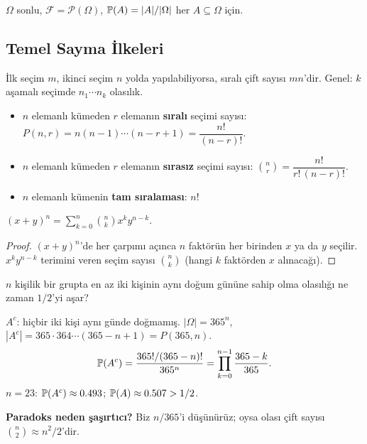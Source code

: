 \begin{tanim}\label{def:klasik}
$\Omega$ sonlu, $\mathcal{F} = \mathcal{P}(\Omega)$,
$\mathbb{P}(A) = |A|/|\Omega|$ her $A \subseteq \Omega$ için.
\end{tanim}

\subsection{Temel Sayma İlkeleri}

\begin{teorem}\label{thm:carpim_ilkesi}
İlk seçim $m$, ikinci seçim $n$ yolda yapılabiliyorsa, sıralı çift sayısı $mn$'dir.
Genel: $k$ aşamalı seçimde $n_1 \cdots n_k$ olasılık.
\end{teorem}

\begin{tanim}\label{def:perm_komb}
\begin{itemize}
  \item $n$ elemanlı kümeden $r$ elemanın \textbf{sıralı} seçimi sayısı:
        $P(n,r) = n(n-1)\cdots(n-r+1) = \dfrac{n!}{(n-r)!}$.
  \item $n$ elemanlı kümeden $r$ elemanın \textbf{sırasız} seçimi sayısı:
        $\binom{n}{r} = \dfrac{n!}{r!\,(n-r)!}$.
  \item $n$ elemanlı kümenin \textbf{tam sıralaması}: $n!$
\end{itemize}
\end{tanim}

\begin{teorem}\label{thm:binom}
$(x+y)^n = \sum_{k=0}^n \binom{n}{k} x^k y^{n-k}$.
\end{teorem}

\begin{proof}
$(x+y)^n$'de her çarpımı açınca $n$ faktörün her birinden $x$ ya da $y$ seçilir.
$x^k y^{n-k}$ terimini veren seçim sayısı $\binom{n}{k}$ (hangi $k$ faktörden $x$ alınacağı).
\end{proof}

\begin{ornek}\label{ex:dogumgunu}
$n$ kişilik bir grupta en az iki kişinin aynı doğum gününe sahip olma
olasılığı ne zaman $1/2$'yi aşar?

$A^c$: hiçbir iki kişi aynı günde doğmamış. $|\Omega| = 365^n$,
$|A^c| = 365 \cdot 364 \cdots (365-n+1) = P(365,n)$.
\[
  \mathbb{P}(A^c) = \frac{365!/(365-n)!}{365^n} = \prod_{k=0}^{n-1}\frac{365-k}{365}.
\]
$n=23$: $\mathbb{P}(A^c) \approx 0.493$; $\mathbb{P}(A) \approx 0.507 > 1/2$.

\textbf{Paradoks neden şaşırtıcı?} Biz $n/365$'i düşünürüz; oysa olası çift
sayısı $\binom{n}{2} \approx n^2/2$'dir.
\end{ornek}

